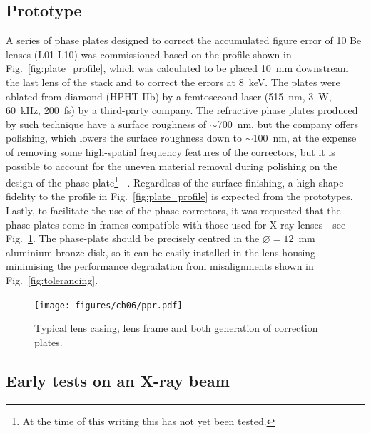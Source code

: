 \begin{refsection}
\clearpage
\section{Prototype}\label{sec:prototype}

A series of phase plates designed to correct the accumulated figure error of 10 Be lenses (L01-L10) was commissioned based on the profile shown in Fig.~\ref{fig:plate_profile}, which was calculated to be placed 10~mm downstream the last lens of the stack and to correct the errors at 8~keV. The plates were ablated from diamond (HPHT IIb) by a femtosecond laser (515~nm, 3~W, 60~kHz, 200~fs) by a third-party company. The refractive phase plates produced by such technique have a surface roughness of $\sim$700~nm, but the company offers polishing, which lowers the surface roughness down to $\sim$100~nm, at the expense of removing some high-spatial frequency features of the correctors, but it is possible to account for the uneven material removal during polishing on the design of the phase plate\footnote{At the time of this writing this has not yet been tested.} [\cite{Antipov2020}]. Regardless of the surface finishing, a high shape fidelity to the profile in Fig.~\ref{fig:plate_profile} is expected from the prototypes. Lastly, to facilitate the use of the phase correctors, it was requested that the phase plates come in frames compatible with those used for X-ray lenses - see Fig.~\ref{fig:potpourri}. The phase-plate should be precisely centred in the $\diameter=12$~mm aluminium-bronze disk, so it can be easily installed in the lens housing minimising the performance degradation from misalignments shown in Fig.~\ref{fig:tolerancing}.

\begin{figure}[t]
        \centering
        {\texttt{[image: figures/ch06/ppr.pdf]}}
        \caption[Lens casing, frame and correction plates]{Typical lens casing, lens frame and both generation of correction plates. }\label{fig:potpourri}
\end{figure}
\subsection{Early tests on an X-ray beam}\label{sec:prototype_testing}


\end{refsection}
